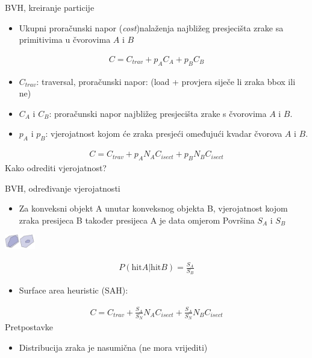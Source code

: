 \documentclass[9pt]{beamer}
\begin{document}
\begin{frame}{BVH, kreiranje particije}
	\begin{itemize}
		\item Ukupni proračunski napor (\textit{cost})nalaženja najbližeg presjecišta zrake sa primitivima u čvorovima $A$ i $B$
	\end{itemize}
	\begin{align*}
		C = C_{trav} + p_AC_A + p_BC_B
	\end{align*}
	\begin{itemize}
		\item $C_{trav}$: traversal, proračunski napor: (load + provjera siječe li zraka bbox ili ne)
		\item $C_{A}$ i $C_{B}$:  proračunski napor najbližeg presjecišta zrake s čvorovima $A$ i $B$. 
		\item $p_{A}$ i $p_{B}$:  vjerojatnost kojom će zraka presjeći omeđujući kvadar čvorova $A$ i $B$. 
	\end{itemize}
	\begin{align*}
	C = C_{trav} + p_AN_A C_{isect} + p_BN_B C_{isect}
	\end{align*}
	Kako odrediti vjerojatnost?
\end{frame}

\begin{frame}{BVH, određivanje vjerojatnosti}
	\begin{itemize}
		\item Za konveksni objekt A unutar konveksnog objekta B, vjerojatnost kojom zraka presijeca B također presijeca A je data omjerom Površina $S_A$ i $S_B$
	\end{itemize}
\begin{center}
\includegraphics[width=0.1\textwidth]{slike/slide_031.jpg}
\end{center}
	\begin{align*}
		P(\textrm{hit} A | \textrm{hit} B) = \frac{S_A}{S_B}
	\end{align*}
	\begin{itemize}
		\item Surface area heuristic (SAH):
	\end{itemize}
	\begin{align*}
		C = C_{trav} + \frac{S_A}{S_N}N_A C_{isect} + \frac{S_A}{S_N}N_B C_{isect}
	\end{align*}
	Pretpostavke
	\begin{itemize}
		\item Distribucija zraka je nasumična (ne mora vrijediti)
	\end{itemize}
\end{frame}
\end{document}
